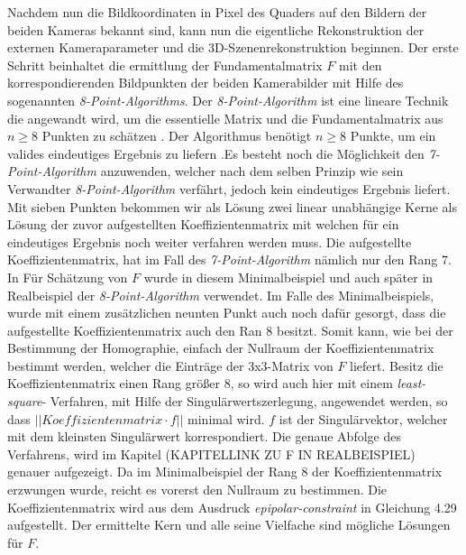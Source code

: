 Nachdem nun die Bildkoordinaten in Pixel des Quaders auf den Bildern der beiden Kameras bekannt sind, kann nun die eigentliche Rekonstruktion der externen Kameraparameter und die 3D-Szenenrekonstruktion beginnen. Der erste Schritt beinhaltet die ermittlung der Fundamentalmatrix $F$ mit den korrespondierenden Bildpunkten der beiden Kamerabilder mit Hilfe des sogenannten  \textit{8-Point-Algorithms}. Der \textit{8-Point-Algorithm} ist eine lineare Technik die angewandt wird, um die essentielle Matrix und die Fundamentalmatrix aus  $n \geq 8$ Punkten zu schätzen \cite{Zhang2014,HZ}. Der Algorithmus benötigt $n \geq 8$ Punkte, um ein valides eindeutiges Ergebnis zu liefern \cite{HZ,Ferid}.Es besteht noch die Möglichkeit den \textit{7-Point-Algorithm} anzuwenden, welcher nach dem selben Prinzip wie sein Verwandter \textit{8-Point-Algorithm} verfährt, jedoch kein eindeutiges Ergebnis liefert. Mit sieben Punkten bekommen wir als Lösung zwei linear unabhängige Kerne als Lösung der zuvor aufgestellten Koeffizientenmatrix mit welchen für ein eindeutiges Ergebnis noch weiter verfahren werden muss\cite{HZ,Ferid}. Die aufgestellte Koeffizientenmatrix, hat im Fall des \textit{7-Point-Algorithm} nämlich nur den Rang 7\cite{HZ}. In Für Schätzung von $F$ wurde in diesem Minimalbeispiel und auch später in Realbeispiel der \textit{8-Point-Algorithm} verwendet. Im Falle des Minimalbeispiels, wurde mit einem zusätzlichen neunten Punkt auch noch dafür gesorgt, dass die aufgestellte Koeffizientenmatrix auch den Ran 8 besitzt. Somit kann, wie bei der Bestimmung der Homographie, einfach der Nullraum der Koeffizientenmatrix bestimmt werden, welcher die Einträge der 3x3-Matrix von $F$ liefert\cite{HZ}. Besitz die Koeffizientenmatrix einen Rang größer 8, so wird auch hier mit einem \textit{least-square}- Verfahren, mit Hilfe der Singulärwertszerlegung, angewendet werden, so dass $||\textit{Koeffizientenmatrix} \cdot f||$ minimal wird. $f$ ist der Singulärvektor, welcher mit dem kleinsten Singulärwert korrespondiert\cite{HZ}. Die genaue Abfolge des Verfahrens, wird im Kapitel (KAPITELLINK ZU F IN REALBEISPIEL) genauer aufgezeigt. Da im Minimalbeispiel der Rang 8 der Koeffizientenmatrix erzwungen wurde, reicht es vorerst den Nullraum zu bestimmen. Die Koeffizientenmatrix wird aus dem Ausdruck \textit{epipolar-constraint} in Gleichung 4.29 aufgestellt. Der ermittelte Kern und alle seine Vielfache sind mögliche Lösungen für $F$\cite{HZ,Ferid}. 

